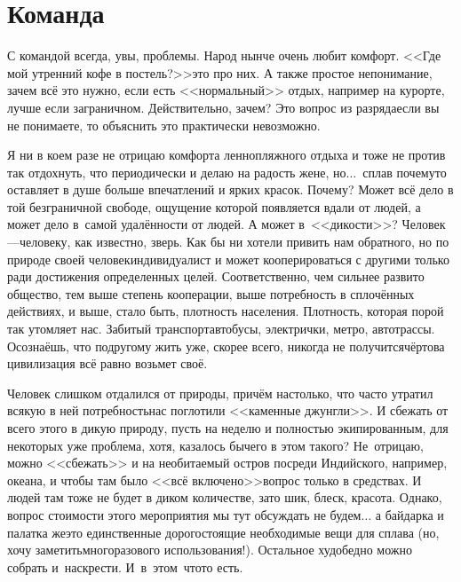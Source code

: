 \chapter{Команда} 
\vepsianrose

С командой всегда, увы, проблемы. Народ нынче очень любит комфорт. <<Где мой утренний кофе в постель?>>\mdash это про них. А также простое непонимание, зачем всё это нужно, если есть <<нормальный>> отдых, например на курорте, лучше если заграничном. Действительно, зачем? Это вопрос из разряда\mdash если вы не понимаете, то объяснить это практически невозможно. 

Я ни в коем разе не отрицаю комфорта ленно\sdash пляжного отдыха и тоже не против так отдохнуть, что периодически и делаю на радость жене, но$\ldots$~сплав почему\sdash то оставляет в душе больше впечатлений и ярких красок. Почему? Может всё дело в той безграничной свободе, ощущение которой появляется вдали от людей, а может дело в~самой удалённости от людей. А может в~<<дикости>>? Человек\thinspace---\thinspace человеку, как известно, зверь. Как бы ни хотели привить нам обратного, но по природе своей человек\mdash индивидуалист и может кооперироваться с другими только ради достижения определенных целей. Соответственно, чем сильнее развито общество, тем выше степень кооперации, выше потребность в сплочённых действиях, и выше, стало быть, плотность населения. Плотность, которая порой так утомляет нас. Забитый транспорт\mdash автобусы, электрички, метро, автотрассы. Осознаёшь, что по\sdash другому жить уже, скорее всего, никогда не получится\mdash чёртова цивилизация всё равно возьмет своё.

Человек слишком отдалился от природы, причём настолько, что часто утратил всякую в ней потребность\mdash нас поглотили <<каменные джунгли>>. И сбежать от всего этого в дикую природу, пусть на неделю и полностью экипированным, для некоторых уже проблема, хотя, казалось бы\mdash чего в этом такого? Не~отрицаю, можно <<сбежать>> и на необитаемый остров посреди Индийского, например, океана, и чтобы там было <<всё включено>>\mdash вопрос только в средствах. И людей там тоже не будет в диком количестве, зато шик, блеск, красота. Однако, вопрос стоимости этого мероприятия мы тут обсуждать не будем$\ldots$ а байдарка и палатка же\mdash это единственные дорогостоящие необходимые вещи для сплава (но, хочу заметить\mdash многоразового использования!). Остальное худо\sdash бедно можно собрать и~наскрести. И~в~этом~что\sdash то есть. 

